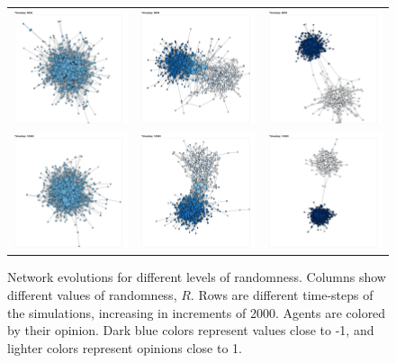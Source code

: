 \documentclass{article}
\begin{document}
\begin{center}
\begin{figure}[H]
\begin{tabular}{ccc}
    \includegraphics[width=.2\linewidth]{../plots/networks/network_example_R0.1_8000.png} & \includegraphics[width=.2\linewidth]{../plots/networks/network_example_R0.3_8000.png} & \includegraphics[width=.2\linewidth]{../plots/networks/network_example_R0.5_8000.png}\\  
    \includegraphics[width=.2\linewidth]{../plots/networks/network_example_R0.1_10000.png} & \includegraphics[width=.2\linewidth]{../plots/networks/network_example_R0.3_10000.png} & \includegraphics[width=.2\linewidth]{../plots/networks/network_example_R0.5_10000.png}\\  
    \end{tabular} 
    \caption{Network evolutions for different levels of randomness. Columns show different values of randomness, $R$. Rows are different time-steps of the simulations, increasing in increments of 2000. Agents are colored by their opinion. Dark blue colors represent values close to -1, and lighter colors represent opinions close to 1.} 
    \label{fig:1} 
    \end{figure} 
\end{center} 
\end{document}
